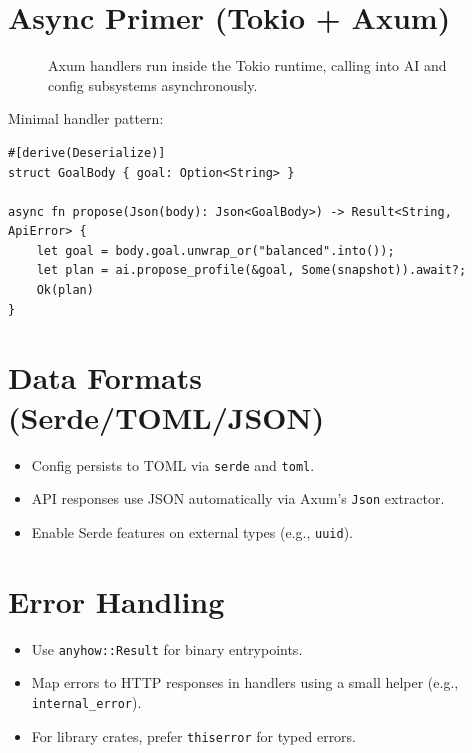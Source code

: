 \section{Async Primer (Tokio + Axum)}
\begin{figure}[h]
    \centering
    \caption{Axum handlers run inside the Tokio runtime, calling into AI and config subsystems asynchronously.}
\end{figure}

Minimal handler pattern:
\begin{verbatim}
#[derive(Deserialize)]
struct GoalBody { goal: Option<String> }

async fn propose(Json(body): Json<GoalBody>) -> Result<String, ApiError> {
    let goal = body.goal.unwrap_or("balanced".into());
    let plan = ai.propose_profile(&goal, Some(snapshot)).await?;
    Ok(plan)
}
\end{verbatim}

\section{Data Formats (Serde/TOML/JSON)}
\begin{itemize}
    \item Config persists to TOML via \texttt{serde} and \texttt{toml}.
    \item API responses use JSON automatically via Axum's \texttt{Json} extractor.
    \item Enable Serde features on external types (e.g., \texttt{uuid}).
\end{itemize}

\section{Error Handling}
\begin{itemize}
    \item Use \texttt{anyhow::Result} for binary entrypoints.
    \item Map errors to HTTP responses in handlers using a small helper (e.g., \texttt{internal\_error}).
    \item For library crates, prefer \texttt{thiserror} for typed errors.
\end{itemize}

